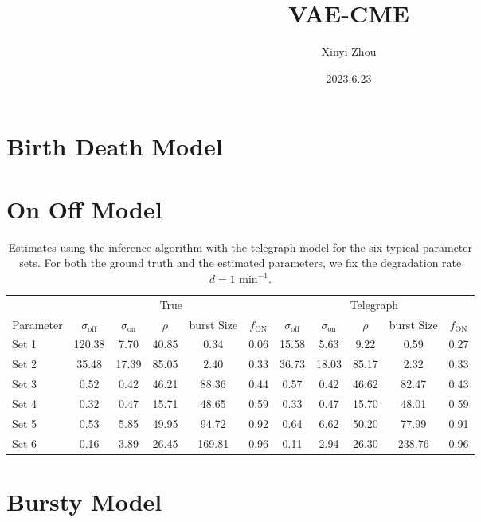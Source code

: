 \documentclass[a4paper,10pt]{article}
\title{VAE-CME}
\author{Xinyi Zhou}
\date{2023.6.23}
\begin{document}
\tableofcontents
\maketitle

\section{Birth Death Model}

\section{On Off Model}

\begin{table}[htbp]
	\centering
	{\small
	\begin{tabular}{l|ccccc|ccccc}
		\toprule
		& \multicolumn{5}{c}{True} & \multicolumn{5}{c}{Telegraph}\\
		\cmidrule{1-11}
		Parameter & $\sigma_\text{off}$ & $\sigma_\text{on}$ & $\rho$  & burst Size & $ f_\text{ON} $ & $\sigma_\text{off}$ & $\sigma_\text{on}$ & $\rho$ & burst Size&$ f_\text{ON} $ \\
		\cmidrule{1-11}
		Set 1 & 120.38 & 7.70  & 40.85 & 0.34   & 0.06  & 15.58 & 5.63  & 9.22  & 0.59   & 0.27  \\ 
		Set 2 & 35.48  & 17.39 & 85.05 & 2.40   & 0.33  & 36.73 & 18.03 & 85.17 & 2.32   & 0.33  \\ 
		Set 3 & 0.52   & 0.42  & 46.21 & 88.36  & 0.44  & 0.57  & 0.42  & 46.62 & 82.47  & 0.43  \\ 
		Set 4 & 0.32   & 0.47  & 15.71 & 48.65  & 0.59  & 0.33  & 0.47  & 15.70 & 48.01  & 0.59  \\ 
		Set 5 & 0.53   & 5.85  & 49.95 & 94.72  & 0.92  & 0.64  & 6.62  & 50.20 & 77.99  & 0.91  \\
		Set 6 & 0.16   & 3.89  & 26.45 & 169.81 & 0.96  & 0.11  & 2.94  & 26.30 & 238.76 & 0.96  \\ 
		\bottomrule 
	\end{tabular}}	
	\caption{Estimates using the inference algorithm with the telegraph model for the six typical parameter sets. For both the ground truth and the estimated parameters, we fix the degradation rate $d = 1 \text{ min}^{-1}$.}
	\label{table-supp-synthetic-mature}
\end{table}

\section{Bursty Model}
\end{document}
